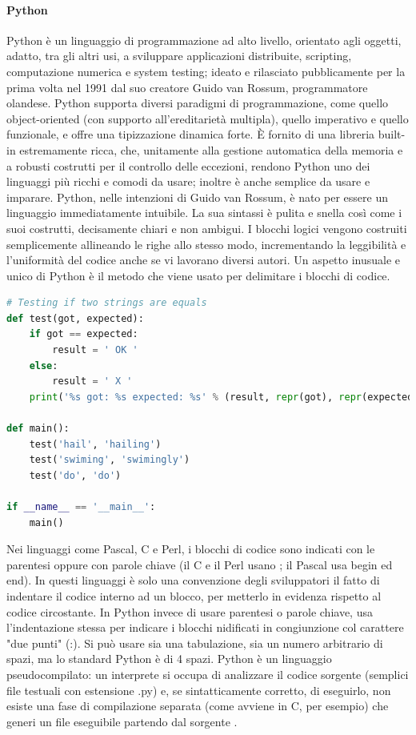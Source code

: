 \paragraph{Python}
Python è un linguaggio di programmazione ad alto livello, orientato agli oggetti, adatto, tra gli altri usi, a sviluppare applicazioni 
distribuite, scripting, computazione numerica e system testing; ideato e rilasciato pubblicamente per la prima volta nel 1991 dal suo 
creatore Guido van Rossum, programmatore olandese.\hfill\break
Python supporta diversi paradigmi di programmazione, come quello object-oriented (con supporto all'ereditarietà multipla), quello 
imperativo e quello funzionale, e offre una tipizzazione dinamica forte. È fornito di una libreria built-in estremamente ricca, che, 
unitamente alla gestione automatica della memoria e a robusti costrutti per il controllo delle eccezioni, rendono Python uno dei linguaggi 
più ricchi e comodi da usare; inoltre è anche semplice da usare e imparare. 
Python, nelle intenzioni di Guido van Rossum, è nato per essere un linguaggio immediatamente intuibile. La sua sintassi è pulita e snella 
così come i suoi costrutti, decisamente chiari e non ambigui. I blocchi logici vengono costruiti semplicemente allineando le righe allo 
stesso modo, incrementando la leggibilità e l'uniformità del codice anche se vi lavorano diversi autori.\hfill\break
Un aspetto inusuale e unico di Python è il metodo che viene usato per delimitare i blocchi di codice.
%
\lstset{style=python_code_style}
\begin{lstlisting}[language=Python, caption={Esempio di programma scritto in Python}]
# Testing if two strings are equals
def test(got, expected):
    if got == expected:
        result = ' OK '
    else:
        result = ' X '
    print('%s got: %s expected: %s' % (result, repr(got), repr(expected)))

def main():
    test('hail', 'hailing')
    test('swiming', 'swimingly')
    test('do', 'do')

if __name__ == '__main__':
    main()
\end{lstlisting}
%
Nei linguaggi come Pascal, C e Perl, i blocchi di codice sono indicati con le parentesi oppure con parole chiave 
(il C e il Perl usano { }; il Pascal usa begin ed end). In questi linguaggi è solo una convenzione degli sviluppatori il fatto di 
indentare il codice interno ad un blocco, per metterlo in evidenza rispetto al codice circostante. In Python invece di usare parentesi 
o parole chiave, usa l'indentazione stessa per indicare i blocchi nidificati in congiunzione col carattere "due punti" (:). Si può usare 
sia una tabulazione, sia un numero arbitrario di spazi, ma lo standard Python è di 4 spazi.
Python è un linguaggio pseudocompilato: un interprete si occupa di analizzare il codice sorgente (semplici file testuali con 
estensione .py) e, se sintatticamente corretto, di eseguirlo, non esiste una fase di compilazione separata (come 
avviene in C, per esempio) che generi un file eseguibile partendo dal sorgente \cite{python-documentation}.
%
